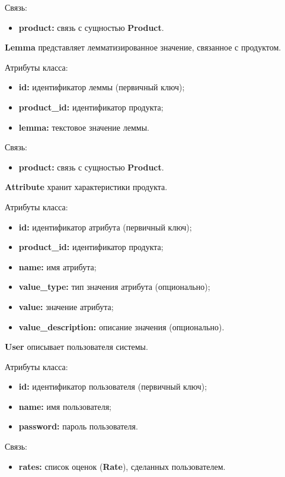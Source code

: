 Связь:
\begin{itemize}
	\item \textbf{product:} связь с сущностью \textbf{Product}.
\end{itemize}

\textbf{Lemma} представляет лемматизированное значение, связанное с продуктом.

Атрибуты класса:
\begin{itemize}
	\item \textbf{id:} идентификатор леммы (первичный ключ);
	\item \textbf{product\_id:} идентификатор продукта;
	\item \textbf{lemma:} текстовое значение леммы.
\end{itemize}

Связь:
\begin{itemize}
	\item \textbf{product:} связь с сущностью \textbf{Product}.
\end{itemize}

\textbf{Attribute} хранит характеристики продукта.

Атрибуты класса:
\begin{itemize}
	\item \textbf{id:} идентификатор атрибута (первичный ключ);
	\item \textbf{product\_id:} идентификатор продукта;
	\item \textbf{name:} имя атрибута;
	\item \textbf{value\_type:} тип значения атрибута (опционально);
	\item \textbf{value:} значение атрибута;
	\item \textbf{value\_description:} описание значения (опционально).
\end{itemize}


\textbf{User} описывает пользователя системы.

Атрибуты класса:
\begin{itemize}
	\item \textbf{id:} идентификатор пользователя (первичный ключ);
	\item \textbf{name:} имя пользователя;
	\item \textbf{password:} пароль пользователя.
\end{itemize}

Связь:
\begin{itemize}
	\item \textbf{rates:} список оценок (\textbf{Rate}), сделанных пользователем.
\end{itemize}


